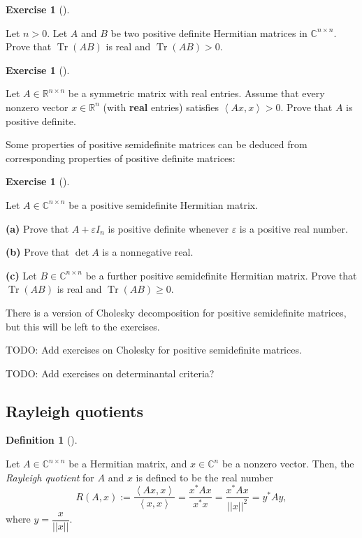 \documentclass[numbers=enddot,12pt,final,onecolumn,notitlepage]{scrartcl}%
\newcounter{exer}
\numberwithin{exer}{subsection}
\theoremstyle{definition}
\newtheorem{defi}[theo]{Definition}
\newenvironment{definition}[1][]
{\begin{defi}[#1]\begin{leftbar}}
{\end{leftbar}\end{defi}}
\newtheorem{exmp}[exer]{Exercise}
\newenvironment{exercise}[1][]
{\begin{exmp}[#1]\begin{leftbar}}
{\end{leftbar}\end{exmp}}
\begin{document}
\begin{exercise}
 Let $n>0$. Let $A$ and $B$ be two positive definite Hermitian
matrices in $\mathbb{C}^{n\times n}$. Prove that $\operatorname*{Tr}\left(
AB\right)  $ is real and $\operatorname*{Tr}\left(  AB\right)  >0$.
\end{exercise}

\begin{exercise}
 Let $A\in\mathbb{R}^{n\times n}$ be a symmetric matrix with real
entries. Assume that every nonzero vector $x\in\mathbb{R}^{n}$ (with
\textbf{real} entries) satisfies $\left\langle Ax,x\right\rangle >0$. Prove
that $A$ is positive definite.
\end{exercise}

Some properties of positive semidefinite matrices can be deduced from
corresponding properties of positive definite matrices:

\begin{exercise}
 Let $A\in\mathbb{C}^{n\times n}$ be a positive semidefinite Hermitian
matrix. \medskip

\textbf{(a)} Prove that $A+\varepsilon I_{n}$ is positive definite whenever
$\varepsilon$ is a positive real number. \medskip

\textbf{(b)} Prove that $\det A$ is a nonnegative real. \medskip

\textbf{(c)} Let $B\in\mathbb{C}^{n\times n}$ be a further positive
semidefinite Hermitian matrix. Prove that $\operatorname*{Tr}\left(
AB\right)  $ is real and $\operatorname*{Tr}\left(  AB\right)  \geq0$.
\end{exercise}

There is a version of Cholesky decomposition for positive semidefinite
matrices, but this will be left to the exercises.

TODO: Add exercises on Cholesky for positive semidefinite matrices.

TODO: Add exercises on determinantal criteria?

\subsection{Rayleigh quotients}

\begin{definition}
Let $A\in\mathbb{C}^{n\times n}$ be a Hermitian matrix, and $x\in
\mathbb{C}^{n}$ be a nonzero vector. Then, the \emph{Rayleigh quotient} for
$A$ and $x$ is defined to be the real number%
\[
R\left(  A,x\right)  :=\dfrac{\left\langle Ax,x\right\rangle }{\left\langle
x,x\right\rangle }=\dfrac{x^{\ast}Ax}{x^{\ast}x}=\dfrac{x^{\ast}Ax}{\left\vert
\left\vert x\right\vert \right\vert ^{2}}=y^{\ast}Ay,
\]
where $y=\dfrac{x}{\left\vert \left\vert x\right\vert \right\vert }$.
\end{definition}
\end{document}
